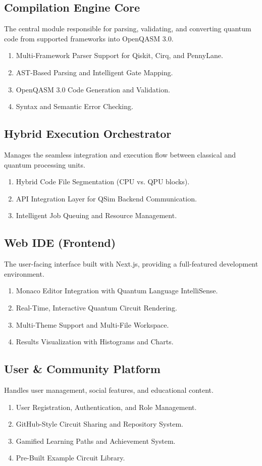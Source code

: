 \subsection{Compilation Engine Core}
The central module responsible for parsing, validating, and converting quantum code from supported frameworks into OpenQASM 3.0.
\begin{enumerate}
    \item Multi-Framework Parser Support for Qiskit, Cirq, and PennyLane.
    \item AST-Based Parsing and Intelligent Gate Mapping.
    \item OpenQASM 3.0 Code Generation and Validation.
    \item Syntax and Semantic Error Checking.
\end{enumerate}

\subsection{Hybrid Execution Orchestrator}
Manages the seamless integration and execution flow between classical and quantum processing units.
\begin{enumerate}
    \item Hybrid Code File Segmentation (CPU vs. QPU blocks).
    \item API Integration Layer for QSim Backend Communication.
    \item Intelligent Job Queuing and Resource Management.
\end{enumerate}

\subsection{Web IDE (Frontend)}
The user-facing interface built with Next.js, providing a full-featured development environment.
\begin{enumerate}
    \item Monaco Editor Integration with Quantum Language IntelliSense.
    \item Real-Time, Interactive Quantum Circuit Rendering.
    \item Multi-Theme Support and Multi-File Workspace.
    \item Results Visualization with Histograms and Charts.
\end{enumerate}

\subsection{User \& Community Platform}
Handles user management, social features, and educational content.
\begin{enumerate}
    \item User Registration, Authentication, and Role Management.
    \item GitHub-Style Circuit Sharing and Repository System.
    \item Gamified Learning Paths and Achievement System.
    \item Pre-Built Example Circuit Library.
\end{enumerate}

